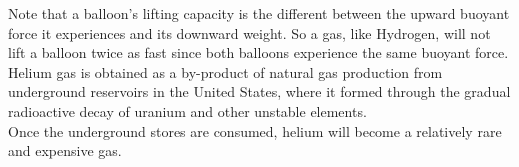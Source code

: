 \documentclass[12pt]{article}
\theoremstyle{definition}
\begin{document}
Note that a balloon's lifting capacity is the different between the upward buoyant force it experiences and its downward weight.
So a gas, like Hydrogen, will not lift a balloon twice as fast since both balloons experience the same buoyant force. \\

Helium gas is obtained as a by-product of natural gas production from underground reservoirs in the United States, where it formed through the gradual radioactive decay of uranium and other unstable elements. \\
Once the underground stores are consumed, helium will become a relatively rare and expensive gas.

\newpage


\clearpage
\printindex
\end{document}
